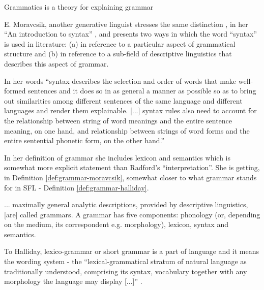 \begin{definition}\label{def:grammatics-halliday}
	Grammatics is a theory for explaining grammar \citep[p.369]{Halliday2002}
\end{definition}

E. Moravcsik, another generative linguist stresses the same distinction , in her ``An introduction to syntax'' \citep{Moravcsik2006}, and presents two ways in which the word ``syntax'' is used in literature: (a) in reference to a particular aspect of grammatical structure and (b) in reference to a sub-field of descriptive linguistics that describes this aspect of grammar. 

In her words ``syntax describes the selection and order of words that make well-formed sentences and it does so in as general a manner as possible so as to bring out similarities among different sentences of the same language and different languages and render them explainable. [...] syntax rules also need to account for the relationship between string of word meanings and the entire sentence meaning, on one hand, and relationship between strings of word forms and the entire sentential phonetic form, on the other hand.'' \citep[p.25]{Moravcsik2006}

In her definition of grammar she includes lexicon and semantics which is somewhat more explicit statement than Radford's ``interpretation''. She is getting, in Definition \ref{def:grammar-moravcsik}, somewhat closer to what grammar stands for in SFL - Definition \ref{def:grammar-halliday}. 

\begin{definition}\label{def:grammar-moravcsik}
... maximally general analytic descriptions, provided by descriptive linguistics, [are] called grammars. A grammar has five components: phonology (or, depending on the medium, its correspondent e.g. morphology), lexicon, syntax and semantics\citep[pp.24--25]{Moravcsik2006}. 
\end{definition}


\begin{definition}\label{def:grammar-halliday}
	To Halliday, lexico-grammar or short grammar is a part of language and it means the wording system - the ``lexical-grammatical stratum of natural language as traditionally understood, comprising its syntax, vocabulary together with any morphology the language may display [...]'' \citep[p.369]{Halliday2002}.
\end{definition}

